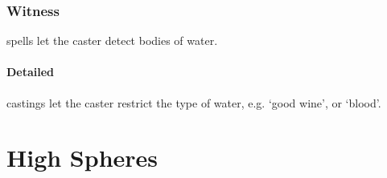 \begin{multicols}{2}
\subsubsection{Witness}
spells let the caster detect bodies of water.

\paragraph{Detailed}
castings let the caster restrict the type of water, e.g. `good wine', or `blood'.

\end{multicols}

\section{High Spheres}

